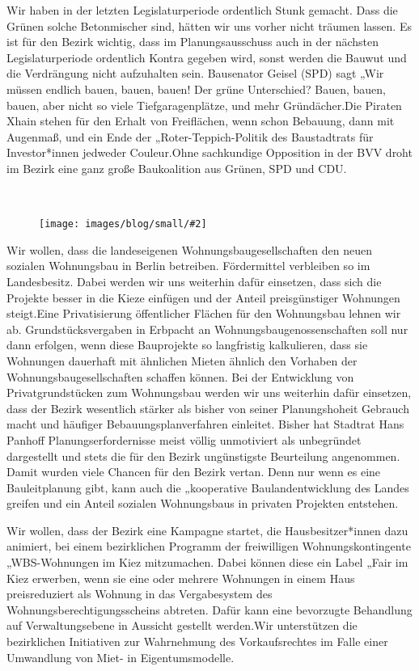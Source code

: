 \documentclass[a4paper,10pt]{article}
\newcommand{\mysection}[1]{{\vspace{1cm}\noindent\color{gray}{\ttfamily\LARGE\raggedright #1}\\\medskip}}
\newcommand{\abschnitt}[2]{%
\mysection{\raggedright #1}%
\begin{figure}[t]%
\vspace*{-2.7cm}%
\hspace*{-2.1cm}%
\texttt{[image: images/blog/small/\#2]} %
\end{figure}%
}
\newcommand{\flachmann}[1]{
\begin{figure}[b!]
\\
\parbox{5cm}{
\hspace*{-7cm}%
\vspace*{1cm}%
\texttt{[image: ./images/blog/small/\#1]}
}
\end{figure}
}
\begin{document}
Wir haben in der letzten Legislaturperiode ordentlich Stunk gemacht.
Dass die Grünen solche Betonmischer sind, hätten wir uns vorher nicht
träumen lassen. Es ist für den Bezirk wichtig, dass im Planungsausschuss
auch in der nächsten Legislaturperiode ordentlich Kontra gegeben wird,
sonst werden die Bauwut und die Verdrängung nicht aufzuhalten
sein. Bausenator Geisel (SPD) sagt „Wir müssen endlich bauen, bauen,
bauen!{\grqq} Der grüne Unterschied? Bauen, bauen, bauen, aber nicht so viele
Tiefgaragenplätze, und mehr Gründächer.Die Piraten Xhain stehen für den
Erhalt von Freiflächen, wenn schon Bebauung, dann mit Augenmaß, und ein
Ende der „Roter-Teppich-Politik{\grqq} des Baustadtrats für Investor*innen
jedweder Couleur.Ohne sachkundige Opposition in der BVV droht im Bezirk
eine ganz große Baukoalition aus Grünen, SPD und CDU.


\clearpage
\abschnitt{Wohnen und Mieten}{GefahrengebietMiete.png}

Wir wollen, dass die landeseigenen Wohnungsbaugesellschaften den neuen
sozialen Wohnungsbau in Berlin betreiben. Fördermittel verbleiben so im
Landesbesitz. Dabei werden wir uns weiterhin dafür einsetzen, dass sich
die Projekte besser in die Kieze einfügen und der Anteil preisgünstiger
Wohnungen steigt.Eine Privatisierung öffentlicher Flächen für den
Wohnungsbau lehnen wir ab. Grundstücksvergaben in Erbpacht an
Wohnungsbaugenossenschaften soll nur dann erfolgen, wenn diese
Bauprojekte so langfristig kalkulieren, dass sie Wohnungen dauerhaft mit
ähnlichen Mieten ähnlich den Vorhaben der Wohnungsbaugesellschaften
schaffen können. Bei der Entwicklung von Privatgrundstücken zum
Wohnungsbau werden wir uns weiterhin dafür einsetzen, dass der Bezirk
wesentlich stärker als bisher von seiner Planungshoheit Gebrauch macht
und häufiger Bebauungsplanverfahren einleitet. Bisher hat Stadtrat Hans
Panhoff Planungserfordernisse meist völlig unmotiviert als unbegründet
dargestellt und stets die für den Bezirk ungünstigste Beurteilung
angenommen. Damit wurden viele Chancen für den Bezirk vertan. Denn nur
wenn es eine Bauleitplanung gibt, kann auch die „kooperative
Baulandentwicklung{\grqq} des Landes greifen und ein Anteil sozialen
Wohnungsbaus in privaten Projekten entstehen.

Wir wollen, dass der Bezirk eine Kampagne startet, die
Hausbesitzer*innen dazu animiert, bei einem bezirklichen Programm der
freiwilligen Wohnungskontingente „WBS-Wohnungen im Kiez{\grqq} mitzumachen.
Dabei können diese ein Label „Fair im Kiez{\grqq} erwerben, wenn sie eine
oder mehrere Wohnungen in einem Haus preisreduziert als Wohnung in das
Vergabesystem des Wohnungsberechtigungsscheins abtreten. Dafür kann eine
bevorzugte Behandlung auf Verwaltungsebene in Aussicht gestellt
werden.Wir unterstützen die bezirklichen Initiativen zur Wahrnehmung des
Vorkaufsrechtes im Falle einer Umwandlung von Miet- in Eigentumsmodelle.
\end{document}
